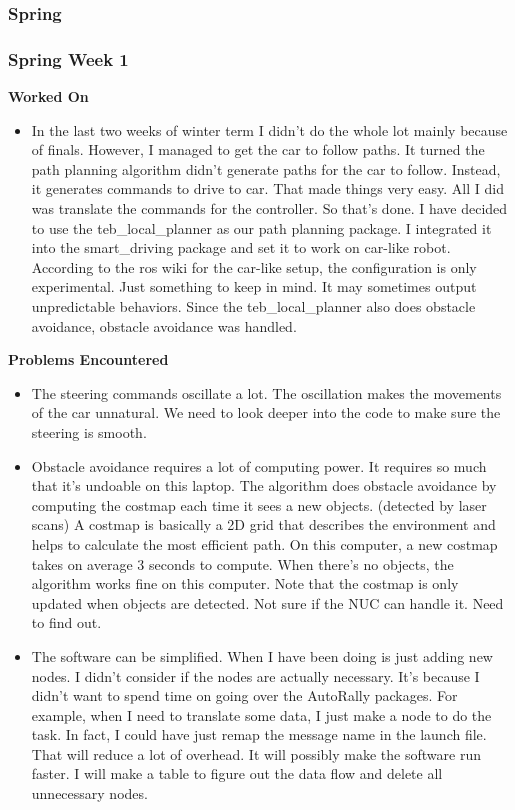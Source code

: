 \documentclass[compsoc,draftclsnofoot,onecolumn,10pt]{IEEEtran}
\begin{document}
\subsubsection{Spring}

\subsubsection*{Spring Week 1}
\textbf{Worked On}
\begin{itemize}
  \item In the last two weeks of winter term I didn't do the whole lot
  mainly because of finals. However, I managed to get the car to follow
  paths. It turned the path planning algorithm didn't generate paths for
  the car to follow. Instead, it generates commands to drive to car. That
  made things very easy. All I did was translate the commands for the
  controller. So that's done. I have decided to use the teb\_local\_planner
  as our path planning package. I integrated it into the smart\_driving
  package and set it to work on car-like robot. According to the ros wiki
  for the car-like setup, the configuration is only experimental. Just
  something to keep in mind. It may sometimes output unpredictable behaviors.
  Since the teb\_local\_planner also does obstacle avoidance, obstacle
  avoidance was handled.
\end{itemize}

\textbf{Problems Encountered}
\begin{itemize}
  \item The steering commands oscillate a lot. The oscillation makes the
  movements of the car unnatural. We need to look deeper into the code
  to make sure the steering is smooth.
  \item Obstacle avoidance requires a lot of computing power. It requires
  so much that it's undoable on this laptop. The algorithm does obstacle
  avoidance by computing the costmap each time it sees a new objects.
  (detected by laser scans) A costmap is basically a 2D grid that describes
  the environment and helps to calculate the most efficient path. On this
  computer, a new costmap takes on average 3 seconds to compute. When
  there's no objects, the algorithm works fine on this computer. Note that
  the costmap is only updated when objects are detected. Not sure if the
  NUC can handle it. Need to find out.
  \item The software can be simplified. When I have been doing is just
  adding new nodes. I didn't consider if the nodes are actually necessary.
  It's because I didn't want to spend time on going over the AutoRally
  packages. For example, when I need to translate some data, I just make
  a node to do the task. In fact, I could have just remap the message
  name in the launch file. That will reduce a lot of overhead. It will
  possibly make the software run faster. I will make a table to figure
  out the data flow and delete all unnecessary nodes.
\end{itemize}
\end{document}
